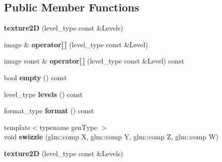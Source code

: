 \subsection*{\-Public \-Member \-Functions}
\begin{DoxyCompactItemize}
\item 
\hypertarget{classgli_1_1texture2D_a19e025dd274930350da8dad8bccd2d4d}{{\bfseries texture2\-D} (level\-\_\-type const \&\-Levels)}\label{classgli_1_1texture2D_a19e025dd274930350da8dad8bccd2d4d}

\item 
\hypertarget{classgli_1_1texture2D_a1f9fb56a09ce2c09a71fd563d5a8f8e6}{image \& {\bfseries operator\mbox{[}$\,$\mbox{]}} (level\-\_\-type const \&\-Level)}\label{classgli_1_1texture2D_a1f9fb56a09ce2c09a71fd563d5a8f8e6}

\item 
\hypertarget{classgli_1_1texture2D_a676f2f97f99b625dbe8a2c369016399f}{image const \& {\bfseries operator\mbox{[}$\,$\mbox{]}} (level\-\_\-type const \&\-Level) const }\label{classgli_1_1texture2D_a676f2f97f99b625dbe8a2c369016399f}

\item 
\hypertarget{classgli_1_1texture2D_ad6ecacbb8e2dd2a76e1853b7c2fa30e7}{bool {\bfseries empty} () const }\label{classgli_1_1texture2D_ad6ecacbb8e2dd2a76e1853b7c2fa30e7}

\item 
\hypertarget{classgli_1_1texture2D_ad9c5c7683b8351efacd8fe2fe11a9bad}{level\-\_\-type {\bfseries levels} () const }\label{classgli_1_1texture2D_ad9c5c7683b8351efacd8fe2fe11a9bad}

\item 
\hypertarget{classgli_1_1texture2D_a77d465b8ad2dea291981eea2ec6f0cb3}{format\-\_\-type {\bfseries format} () const }\label{classgli_1_1texture2D_a77d465b8ad2dea291981eea2ec6f0cb3}

\item 
\hypertarget{classgli_1_1texture2D_ab9d90abcdc921ebc096beaec9a86f2d1}{{\footnotesize template$<$typename gen\-Type $>$ }\\void {\bfseries swizzle} (glm\-::comp \-X, glm\-::comp \-Y, glm\-::comp \-Z, glm\-::comp \-W)}\label{classgli_1_1texture2D_ab9d90abcdc921ebc096beaec9a86f2d1}

\item 
\hypertarget{classgli_1_1texture2D_a19e025dd274930350da8dad8bccd2d4d}{{\bfseries texture2\-D} (level\-\_\-type const \&\-Levels)}\label{classgli_1_1texture2D_a19e025dd274930350da8dad8bccd2d4d}


\end{DoxyCompactItemize}
